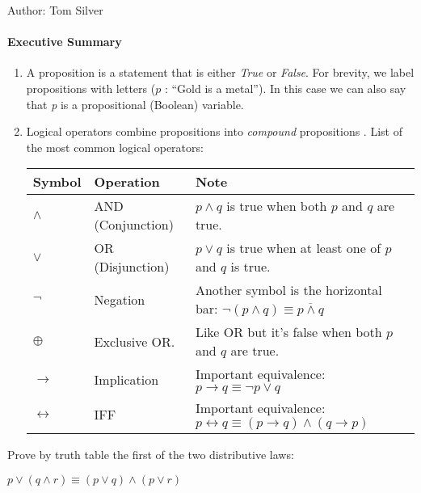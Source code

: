 \documentclass[solution, letterpaper]{cs20inclass}
\begin{document}

\noindent Author: Tom Silver%

\paragraph*{Executive Summary}
\begin{enumerate}

\item  A proposition is a statement that is either \emph{True} or \emph{False}. For brevity, we label propositions with letters ($p$ : ``Gold is a metal'').  In this case we can also say that \emph{p} is a propositional (Boolean) variable. 

\item Logical operators combine propositions into \emph{compound} propositions . List of the most common logical operators: 


\begin{tabular}{ | l l l |}
\hline
Symbol & Operation & Note\\
\hline
$\land$ & AND (Conjunction) & $p \land q$ is true when both $p$ and $q$ are true.\\
\hline
$\lor$ & OR (Disjunction)& $p \lor q$ is true when at least one of $p$ and $q$ is true.\\
\hline
$\neg$ & Negation & Another symbol is the horizontal bar: $\neg(p \land q) \equiv \overline{p \land q}$\\
\hline
$\oplus$ & Exclusive OR. & Like OR but it's false when both $p$ and $q$ are true. \\
\hline
$\to$ & Implication & Important equivalence: $p\to q \equiv \neg p \lor q$\\
\hline
$\leftrightarrow$ & IFF & Important equivalence: $p \leftrightarrow q \equiv (p \to q) \land (q \to p)$\\
\hline
\end{tabular}
\end{enumerate}

\problem

Prove by truth table the first of the two distributive laws: 
\begin{center}
$p \lor (q \land r) \equiv (p \lor q) \land (p \lor r)$
\end{center}
\end{document}
